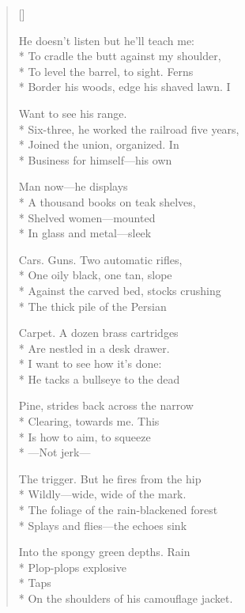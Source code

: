 \label{ch:target_practice}
\settowidth{\versewidth}{Border his woods, edge his shaved lawn.       I}
\begin{verse}[\versewidth]

He doesn't listen but he'll teach me:\\*
To cradle the butt against my shoulder, \\*
To level the barrel, to sight.     Ferns\\*
Border his woods, edge his shaved lawn.       I

Want to see his range.\\*
Six-three, he worked the railroad five years,\\*
Joined the union, organized.     In\\*
Business for himself---his own

Man now---he displays\\*
A thousand books on teak shelves,\\*
Shelved women---mounted\\*
In glass and metal---sleek

Cars. Guns.   Two automatic rifles,\\*
One oily black, one tan, slope\\*
Against the carved bed, stocks crushing\\*
The thick pile of the Persian

Carpet.    A dozen brass cartridges\\*
Are nestled in a desk drawer.\\*
I want to see how it's done:\\*
He tacks a bullseye to the dead

Pine, strides back across the narrow\\*
Clearing, towards me.      This\\*
Is how to aim, to squeeze\\*
---Not jerk---


The trigger.    But he fires from the hip\\*
Wildly---wide, wide of the mark.\\*
The foliage of the rain-blackened forest\\*
Splays and flies---the echoes sink

Into the spongy green depths.   Rain\\*
Plop-plops explosive\\*
Taps\\*
On the shoulders of his camouflage jacket.
\end{verse}
